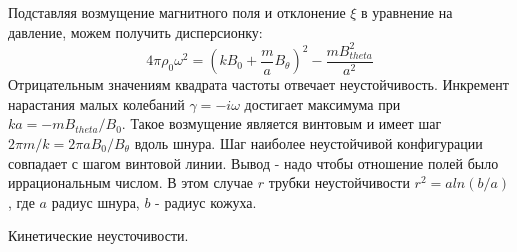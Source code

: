 \documentclass[10pt, a4paper]{article}
\begin{document}
Подставляя возмущение магнитного поля и отклонение $\xi$ в уравнение на давление, можем получить дисперсионку:
\begin{equation}
4 \pi \rho_0 \omega^2=(kB_0 + \frac{m}{a} B_{\theta})^2 - \frac{m B^{2}_{theta}}{a^2}
\end{equation}
Отрицательным значениям квадрата частоты отвечает неустойчивость. Инкремент нарастания малых колебаний $\gamma = -i \omega$ достигает максимума при $ka=-mB_{theta}/B_0$. Такое возмущение является винтовым и имеет шаг $2 \pi m/k=2 \pi a B_0/B_{\theta}$ вдоль шнура. Шаг наиболее неустойчивой конфигурации совпадает с шагом винтовой линии. Вывод - надо чтобы отношение полей было иррациональным числом.
В этом случае $r$ трубки неустойчивости $r^2=a ln(b/a)$, где $a$ радиус шнура, $b$ - радиус кожуха.

Кинетические неусточивости.
\end{document}
